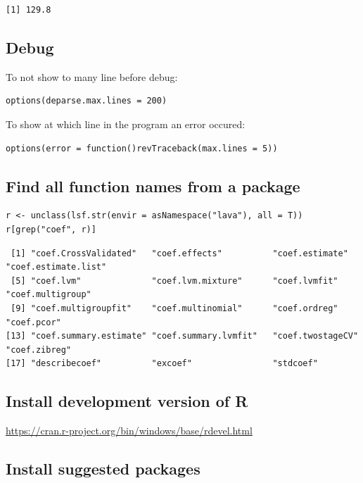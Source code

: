 \documentclass{article}
\begin{document}
\begin{verbatim}
[1] 129.8
\end{verbatim}

\subsection{Debug}
\label{sec:org7caaf3b}
To not show to many line before debug:
\lstset{language=r,label= ,caption= ,captionpos=b,numbers=none}
\begin{lstlisting}
options(deparse.max.lines = 200)
\end{lstlisting}

To show at which line in the program an error occured:
\lstset{language=r,label= ,caption= ,captionpos=b,numbers=none}
\begin{lstlisting}
options(error = function()revTraceback(max.lines = 5))
\end{lstlisting}

\subsection{Find all function names from a package}
\label{sec:org598e6c1}
\lstset{language=r,label= ,caption= ,captionpos=b,numbers=none}
\begin{lstlisting}
r <- unclass(lsf.str(envir = asNamespace("lava"), all = T))
r[grep("coef", r)]
\end{lstlisting}

\begin{verbatim}
 [1] "coef.CrossValidated"   "coef.effects"          "coef.estimate"         "coef.estimate.list"   
 [5] "coef.lvm"              "coef.lvm.mixture"      "coef.lvmfit"           "coef.multigroup"      
 [9] "coef.multigroupfit"    "coef.multinomial"      "coef.ordreg"           "coef.pcor"            
[13] "coef.summary.estimate" "coef.summary.lvmfit"   "coef.twostageCV"       "coef.zibreg"          
[17] "describecoef"          "excoef"                "stdcoef"
\end{verbatim}

\subsection{Install development version of R}
\label{sec:org351a6aa}
\url{https://cran.r-project.org/bin/windows/base/rdevel.html}

\subsection{Install suggested packages}
\label{sec:orgb38a83c}
\end{document}
